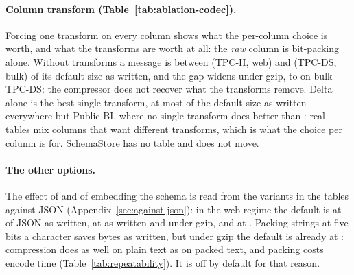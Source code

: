 \begin{table}[t]
\centering\footnotesize
{}
\caption{Column transform: \colbin{}'s size with every integer column forced
to raw, delta or frame of reference, over its size with the transform
chosen per column, as written and under gzip.}
\label{tab:ablation-codec}
\end{table}

\paragraph{Column transform (Table~\ref{tab:ablation-codec}).} Forcing one
transform on every column shows what the per-column choice is worth, and
what the transforms are worth at all: the \emph{raw} column is bit-packing
alone. Without transforms a message is between
 (TPC-H, web) and
 (TPC-DS, bulk) of its default size
as written, and the gap widens under gzip, to
 on bulk TPC-DS: the compressor
does not recover what the transforms remove. Delta alone is the best single
transform, at most  of the
default size as written everywhere but Public BI, where no single transform
does better than : real tables
mix columns that want different transforms, which is what the choice per
column is for. SchemaStore has no table and does not
move.

\paragraph{The other options.} The effect of  and of embedding
the schema is read from the variants in the tables against JSON
(Appendix~\ref{sec:against-json}): in the web regime the default is at
 of JSON as written,  at
 as written and
 under gzip, and  at
. Packing strings at
five bits a character saves bytes as written, but under gzip the default is
already at : compression does as well on plain
text as on packed text, and packing costs encode time
(Table~\ref{tab:repeatability}). It is off by default for that reason.
